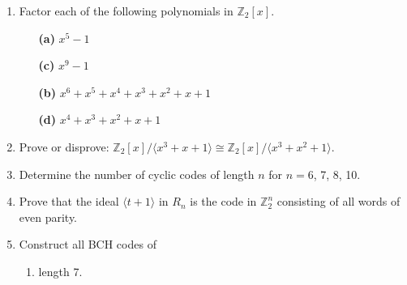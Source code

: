 {\begin{enumerate}
 
\bf\item\rm
Factor each of the following polynomials in ${\mathbb Z}_2[x]$.

\vspace{3pt}        %

\hspace{-7pt}
\begin{minipage}[t]{4.6in}
\noindent
\begin{minipage}[t]{2.25in}
\begin{itemize}
 
 \item[{\bf (a)}]
$x^5- 1$
 
 \item[{\bf (c)}]
$x^9 - 1$
 
\end{itemize}
\end{minipage} \hfill
\begin{minipage}[t]{2.25in}
\begin{itemize}
 
 \item[{\bf (b)}]
$x^6 + x^5 + x^4 + x^3 + x^2 + x + 1$

 \item[{\bf (d)}]
$x^4 +x^3 + x^2 + x + 1$ 

\end{itemize}
\end{minipage}
\end{minipage}

\vspace{2pt}        %







\bf\item\rm
Prove or disprove: ${\mathbb Z}_2[x] / \langle x^3 + x + 1 \rangle \cong
{\mathbb Z}_2[x] / \langle x^3 + x^2 + 1 \rangle$. 


\bf\item\rm
Determine the number of cyclic codes of length $n$ for $n = 6$, 7, 8,
10.


\bf\item\rm
Prove that the ideal $\langle t + 1 \rangle$ in $R_n$ is the code in
${\mathbb Z}_2^n$ consisting of all words of even parity.


\bf\item\rm
Construct all BCH codes of
\begin{enumerate}

\bf\item\rm
length 7.


\end{enumerate}
\end{enumerate}}

